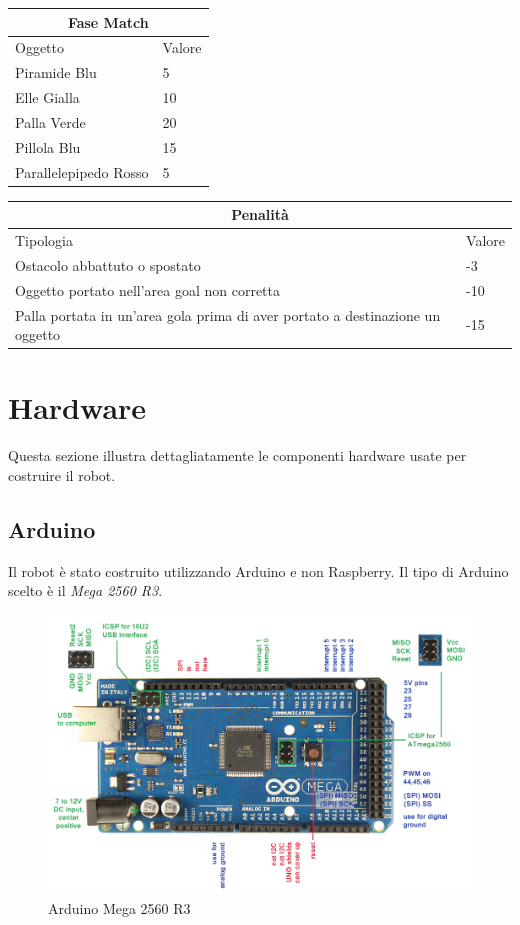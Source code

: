 \documentclass[a4paper,12pt,italian]{article}
\begin{document}
\begin{center}
	\begin{tabular}{ |p{5cm}||p{3cm}| }
 		\hline
 		\multicolumn{2}{|c|}{Fase Match} \\
 		\hline
 		Oggetto & Valore\\
 		\hline
		 Piramide Blu & 5\\
 		 Elle Gialla & 10\\
 		 Palla Verde & 20\\
 		 Pillola Blu & 15\\
 		 Parallelepipedo Rosso & 5\\
		\hline
	\end{tabular}
\end{center}

\begin{center}
	\begin{tabular}{ |p{5cm}||p{3cm}| }
 		\hline
 		\multicolumn{2}{|c|}{Penalità} \\
 		\hline
 		Tipologia & Valore\\
 		\hline
		 Ostacolo abbattuto o spostato & -3\\
 		 Oggetto portato nell'area goal non corretta & -10\\
 		 Palla portata in un'area gola prima di aver portato a destinazione un oggetto & -15\\
		\hline
	\end{tabular}
\end{center}

\section{Hardware}
Questa sezione illustra dettagliatamente le componenti hardware usate per costruire il robot.

\subsection{Arduino}
Il robot è stato costruito utilizzando Arduino e non Raspberry. Il tipo di Arduino scelto è il \textit{Mega 2560 R3}.

\begin{figure}[H]
\begin{center}
\includegraphics[scale=0.6]{arduino}
\caption{Arduino Mega 2560 R3}
\label{Fig: arduino}
\end{center}
\end{figure}
\end{document}
